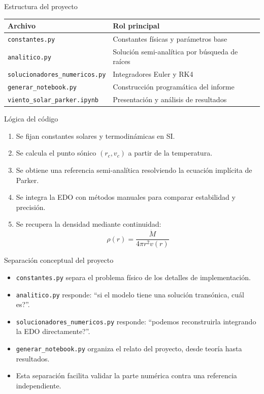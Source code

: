 \documentclass[aspectratio=169]{beamer}
\begin{document}
\begin{frame}{Estructura del proyecto}
  \begin{table}
    \centering
    \begin{tabular}{ll}
      \toprule
      Archivo & Rol principal \\
      \midrule
      \texttt{constantes.py} & Constantes f\'isicas y par\'ametros base \\
      \texttt{analitico.py} & Soluci\'on semi-anal\'itica por b\'usqueda de ra\'ices \\
      \texttt{solucionadores\_numericos.py} & Integradores Euler y RK4 \\
      \texttt{generar\_notebook.py} & Construcci\'on program\'atica del informe \\
      \texttt{viento\_solar\_parker.ipynb} & Presentaci\'on y an\'alisis de resultados \\
      \bottomrule
    \end{tabular}
  \end{table}
\end{frame}

\begin{frame}{L\'ogica del c\'odigo}
  \begin{enumerate}
    \item Se fijan constantes solares y termodin\'amicas en SI.
    \item Se calcula el punto s\'onico $(r_c, v_c)$ a partir de la temperatura.
    \item Se obtiene una referencia semi-anal\'itica resolviendo la ecuaci\'on impl\'icita de Parker.
    \item Se integra la EDO con m\'etodos manuales para comparar estabilidad y precisi\'on.
    \item Se recupera la densidad mediante continuidad:
    \[
      \rho(r) = \frac{\dot{M}}{4\pi r^2 v(r)}
    \]
  \end{enumerate}
\end{frame}

\begin{frame}{Separaci\'on conceptual del proyecto}
  \begin{itemize}
    \item \texttt{constantes.py} separa el problema f\'isico de los detalles de implementaci\'on.
    \item \texttt{analitico.py} responde: ``si el modelo tiene una soluci\'on trans\'onica, \textquestiondown cu\'al es?''.
    \item \texttt{solucionadores\_numericos.py} responde: ``\textquestiondown podemos reconstruirla integrando la EDO directamente?''.
    \item \texttt{generar\_notebook.py} organiza el relato del proyecto, desde teor\'ia hasta resultados.
    \item Esta separaci\'on facilita validar la parte num\'erica contra una referencia independiente.
  \end{itemize}
\end{frame}
\end{document}
